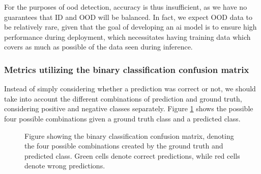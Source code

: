 \documentclass[UKenglish]{uiomasterthesis} %
\theoremstyle{definition}
\begin{document}
For the purposes of \ac{ood} detection, accuracy is thus insufficient, as we have no guarantees that ID and OOD will be balanced. In fact, we expect OOD data to be relatively rare, given that the goal of developing an \ac{ai} model is to ensure high performance during deployment, which necessitates having training data which covers as much as possible of the data seen during inference.

\subsubsection{Metrics utilizing the binary classification confusion matrix}

Instead of simply considering whether a prediction was correct or not, we should take into account the different combinations of prediction and ground truth, considering positive and negative classes separately. Figure \ref{fig:confusion} shows the possible four possible combinations given a ground truth class and a predicted class.

\begin{figure}[H]
    \begin{center}


\end{center}
    \caption[Binary classification confusion matrix]{Figure showing the binary classification confusion matrix, denoting the four possible combinations created by the ground truth and predicted class. Green cells denote correct predictions, while red cells denote wrong predictions.}
\label{fig:confusion}
\end{figure}
\end{document}
